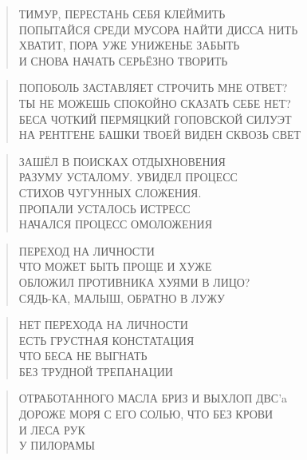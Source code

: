 \poemtitle{***}
\begin{verse}
ТИМУР, ПЕРЕСТАНЬ СЕБЯ КЛЕЙМИТЬ\\
ПОПЫТАЙСЯ СРЕДИ МУСОРА НАЙТИ ДИССА НИТЬ\\
ХВАТИТ, ПОРА УЖЕ УНИЖЕНЬЕ ЗАБЫТЬ\\
И СНОВА НАЧАТЬ СЕРЬЁЗНО ТВОРИТЬ
\end{verse}

\poemtitle{***}
\begin{verse}
ПОПОБОЛЬ ЗАСТАВЛЯЕТ СТРОЧИТЬ МНЕ ОТВЕТ?\\
ТЫ НЕ МОЖЕШЬ СПОКОЙНО СКАЗАТЬ СЕБЕ НЕТ?\\
БЕСА ЧОТКИЙ ПЕРМЯЦКИЙ ГОПОВСКОЙ СИЛУЭТ\\
НА РЕНТГЕНЕ БАШКИ ТВОЕЙ ВИДЕН СКВОЗЬ СВЕТ
\end{verse}

\poemtitle{***}
\begin{verse}
ЗАШЁЛ В ПОИСКАХ ОТДЫХНОВЕНИЯ\\
РАЗУМУ УСТАЛОМУ. УВИДЕЛ ПРОЦЕСС\\
СТИХОВ ЧУГУННЫХ СЛОЖЕНИЯ.\\
ПРОПАЛИ УСТАЛОСЬ ИСТРЕСС\\
НАЧАЛСЯ ПРОЦЕСС ОМОЛОЖЕНИЯ
\end{verse}

\poemtitle{***}
\begin{verse}
ПЕРЕХОД НА ЛИЧНОСТИ\\
ЧТО МОЖЕТ БЫТЬ ПРОЩЕ И ХУЖЕ\\
ОБЛОЖИЛ ПРОТИВНИКА ХУЯМИ В ЛИЦО?\\
СЯДЬ-КА, МАЛЫШ, ОБРАТНО В ЛУЖУ
\end{verse}

\poemtitle{***}
\begin{verse}
НЕТ ПЕРЕХОДА НА ЛИЧНОСТИ\\
ЕСТЬ ГРУСТНАЯ КОНСТАТАЦИЯ\\
ЧТО БЕСА НЕ ВЫГНАТЬ\\
БЕЗ ТРУДНОЙ ТРЕПАНАЦИИ
\end{verse}

\poemtitle{***}
\begin{verse}
ОТРАБОТАННОГО МАСЛА БРИЗ И ВЫХЛОП ДВС'a\\
ДОРОЖЕ МОРЯ С ЕГО СОЛЬЮ, ЧТО БЕЗ КРОВИ\\
И ЛЕСА РУК\\
У ПИЛОРАМЫ
\end{verse}


